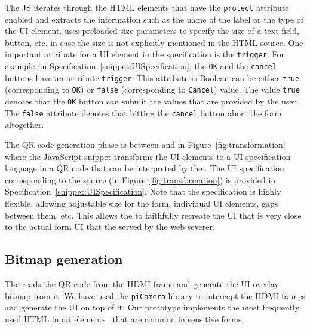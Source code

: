 The \name JS iterates through the HTML elements that have the \texttt{protect} attribute enabled and extracts the information such as the name of the label or the type of the UI element. \device uses preloaded size parameters to specify the size of a text field, button, etc. in case the size is not explicitly mentioned in the HTML source. One important attribute for a UI element in the specification is the \texttt{trigger}. For example, in Specification~\ref{snippet:UISpecification}, the \texttt{OK} and the \texttt{cancel} buttons have an attribute \texttt{trigger}. This attribute is Boolean can be either \texttt{true} (corresponding to \texttt{OK}) or \texttt{false} (corresponding to \texttt{Cancel}) value. The value \texttt{true} denotes that the \texttt{OK} button can submit the values that are provided by the user. The \texttt{false} attribute denotes that hitting the \texttt{cancel} button abort the form altogether. 

The QR code generation phase is between \one and \two in Figure~\ref{fig:transformation} where the \name JavaScript snippet transforms the UI elements to a UI specification language in a QR code that can be interpreted by the \device. The UI specification corresponding to the \html source (in Figure~\ref{fig:transformation}) is provided in Specification~\ref{snippet:UISpecification}. Note that the specification is highly flexible, allowing adjustable size for the form, individual UI elements, gaps between them, etc. This allows the \device to faithfully recreate the UI that is very close to the actual form UI that the served by the web severer. 

\subsection{Bitmap generation}
\label{sec:prototype:impl:bitmap}
%
The \device reads the QR code from the HDMI frame and generate the UI overlay bitmap from it. We have used the \texttt{piCamera} library to intercept the HDMI frames and generate the UI on top of it. Our \name prototype implements the most frequently used HTML input elements~\cite{html_elements} that are common in sensitive forms. 

